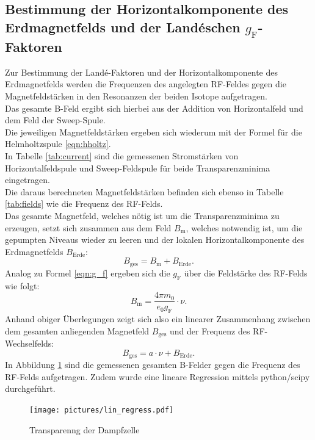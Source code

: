 \subsection{Bestimmung der Horizontalkomponente des Erdmagnetfelds und der Landéschen $g_{\mathrm{F}}$-Faktoren}
Zur Bestimmung der Landé-Faktoren und der Horizontalkomponente des Erdmagnetfelds werden die Frequenzen des angelegten RF-Feldes gegen die Magnetfeldstärken in den Resonanzen der beiden Isotope aufgetragen.\\
Das gesamte B-Feld ergibt sich hierbei aus der Addition von Horizontalfeld und dem Feld der Sweep-Spule.\\
Die jeweiligen Magnetfeldstärken ergeben sich wiederum mit der Formel für die Helmholtzspule \eqref{eqn:hholtz}.\\
In Tabelle \ref{tab:current} sind die gemessenen Stromstärken von Horizontalfeldspule und Sweep-Feldspule für beide Transparenzminima eingetragen.\\
Die daraus berechneten Magnetfeldstärken befinden sich ebenso in Tabelle \ref{tab:fields} wie die Frequenz des RF-Felds.\\
Das gesamte Magnetfeld, welches nötig ist um die Transparenzminima zu erzeugen, setzt sich zusammen aus dem Feld $B_{\mathrm{m}}$, welches notwendig ist, um die gepumpten Niveaus wieder zu leeren und der lokalen Horizontalkomponente des Erdmagnetfelds $B_{\mathrm{Erde}}$:
\begin{equation*}
B_{\mathrm{ges}}=B_{\mathrm{m}}+B_{\mathrm{Erde}}\mathrm{.}
\end{equation*}
Analog zu Formel \eqref{eqn:g_f} ergeben sich die $g_{\mathrm{F}}$ über die Feldstärke des RF-Felds wie folgt:
\begin{equation*}
  B_{\mathrm{m}}=\frac{4\pi m_0}{e_0 g_{\mathrm{F}}}\cdot \nu \mathrm{.}
\end{equation*}
Anhand obiger Überlegungen zeigt sich also ein linearer Zusammenhang zwischen dem gesamten anliegenden Magnetfeld $B_{\mathrm{ges}}$ und der Frequenz des RF-Wechselfelds:
\begin{equation*}
    B_{\mathrm{ges}}=a\cdot \nu+B_{\mathrm{Erde}} \mathrm{.}
\end{equation*}
In Abbildung \ref{fig:regress} sind die gemessenen gesamten B-Felder gegen die Frequenz des RF-Felds aufgetragen. Zudem wurde eine lineare Regression mittels python/scipy \cite{scipy} durchgeführt.
\begin{figure}
  \centering
  \texttt{[image: pictures/lin\_regress.pdf]}
  \caption{Transparenng der Dampfzelle}
  \label{fig:regress}
\end{figure}

